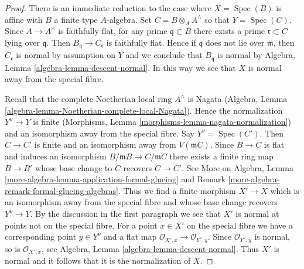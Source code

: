 \documentclass[10pt,a4paper]{amsart}
\theoremstyle{plain}
\theoremstyle{definition}
\theoremstyle{remark}
\numberwithin{equation}{subsection}
\def\Spec{\mathop{\mathrm{Spec}}}
\begin{document}
\begin{proof}
There is an immediate reduction to the case where $X = \Spec(B)$
is affine with $B$ a finite type $A$-algebra. Set $C = B \otimes_A A^\wedge$
so that $Y = \Spec(C)$. Since
$A \to A^\wedge$ is faithfully flat, for any prime $\mathfrak q \subset B$
there exists a prime $\mathfrak r \subset C$ lying over $\mathfrak q$.
Then $B_\mathfrak q \to C_\mathfrak r$ is faithfully flat. Hence if
$\mathfrak q$ does not lie over $\mathfrak m$, then $C_\mathfrak r$
is normal by assumption on $Y$ and we conclude that $B_\mathfrak q$
is normal by Algebra, Lemma \ref{algebra-lemma-descent-normal}.
In this way we see that $X$ is normal away from the special fibre.

\medskip\noindent
Recall that the complete Noetherian local ring $A^\wedge$ is Nagata
(Algebra, Lemma \ref{algebra-lemma-Noetherian-complete-local-Nagata}).
Hence the normalization $Y^\nu \to Y$ is finite
(Morphisms, Lemma \ref{morphisms-lemma-nagata-normalization})
and an isomorphism away from the special fibre. Say $Y^\nu = \Spec(C')$.
Then $C \to C'$ is finite and an isomorphism away from $V(\mathfrak m C)$.
Since $B \to C$ is flat and induces an isomorphism
$B/\mathfrak m B \to C/\mathfrak m C$ there exists a finite
ring map $B \to B'$ whose base change to $C$ recovers $C \to C'$.
See More on Algebra, Lemma
\ref{more-algebra-lemma-application-formal-glueing} and
Remark \ref{more-algebra-remark-formal-glueing-algebras}.
Thus we find a finite morphism $X' \to X$ which is an isomorphism
away from the special fibre and whose base change recovers $Y^\nu \to Y$.
By the discussion in the first paragraph we see that $X'$ is normal at
points not on the special fibre. For a point $x \in X'$ on the special
fibre we have a corresponding point $y \in Y^\nu$ and a flat map
$\mathcal{O}_{X', x} \to \mathcal{O}_{Y^\nu, y}$.
Since $\mathcal{O}_{Y^\nu, y}$ is normal, so is $\mathcal{O}_{X', x}$, see
Algebra, Lemma \ref{algebra-lemma-descent-normal}.
Thus $X'$ is normal and it follows that it is the normalization of $X$.
\end{proof}
\end{document}
